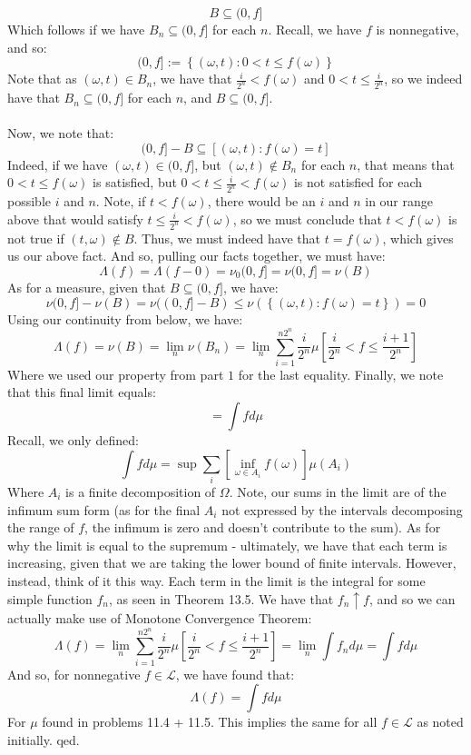 \documentclass[12pt,a4paper]{article}
\newcommand{\1}[1]{\mathbbm{1}\left\{ #1 \right\}}
\newcommand{\lcal}{\mathcal{L}}
\begin{document}
\begin{enumerate}
	$$
		B \subseteq (0,f]
	$$
	Which follows if we have $B_n \subseteq (0,f]$ for each $n$. Recall, we have $f$ is nonnegative, and so:
	$$
		(0,f]:= \left\{(\omega, t) : 0 < t \leq f(\omega)\right\}
	$$
	Note that as $(\omega, t) \in B_n$, we have that $\frac{i}{2^n} < f(\omega)$ and $0 < t \leq \frac{i}{2^n}$, so we indeed have that $B_n \subseteq (0,f]$ for each $n$, and $B \subseteq (0,f]$.
	\\\\
	Now, we note that:
	$$
		(0,f] - B \subseteq [(\omega,t) : f(\omega) = t]
	$$
	Indeed, if we have $(\omega,t) \in (0,f]$, but $(\omega,t) \not\in B_n$ for each $n$, that means that $0 < t \leq f(\omega)$ is satisfied, but $0 < t \leq \frac{i}{2^n} < f(\omega)$ is not satisfied for each possible $i$ and $n$. Note, if $t < f(\omega)$, there would be an $i$ and $n$ in our range above that would satisfy $t \leq \frac{i}{2^n} < f(\omega)$, so we must conclude that $t < f(\omega)$ is not true if $(t,\omega) \not\in B$. Thus, we must indeed have that $t = f(\omega)$, which gives us our above fact. And so, pulling our facts together, we must have:
	$$
		\Lambda(f) = \Lambda(f - 0) = \nu_0(0,f] = \nu(0,f] = \nu(B)
	$$
	As for a measure, given that $B \subseteq (0,f]$, we have: 
	$$
		\nu(0,f] - \nu(B) = \nu((0,f] - B) \leq \nu\left(\left\{(\omega, t) : f(\omega) = t\right\}\right) = 0
	$$
	Using our continuity from below, we have:
	$$
		\Lambda(f) = \nu(B) = \lim_n \nu(B_n) = 
		\lim_n \sum_{i=1}^{n2^n} \frac{i}{2^n} \mu\left[\frac{i}{2^n} < f \leq \frac{i+1}{2^n}\right]
	$$
	Where we used our property from part $1$ for the last equality. Finally, we note that this final limit equals:
	$$
		= \int f d\mu
	$$
	Recall, we only defined:
	$$
		\int f d\mu = \sup \sum_i\left[\inf_{\omega \in A_i} f(\omega)\right]\mu(A_i)
	$$
	Where $A_i$ is a finite decomposition of $\Omega$. Note, our sums in the limit are of the infimum sum form (as for the final $A_i$ not expressed by the intervals decomposing the range of $f$, the infimum is zero and doesn't contribute to the sum). As for why the limit is equal to the supremum - ultimately, we have that each term is increasing, given that we are taking the lower bound of finite intervals. However, instead, think of it this way. Each term in the limit is the integral for some simple function $f_n$, as seen in Theorem 13.5. We have that $f_n \uparrow f$, and so we can actually make use of Monotone Convergence Theorem:
	$$
		\Lambda(f) = \lim_n \sum_{i=1}^{n2^n} \frac{i}{2^n} \mu\left[\frac{i}{2^n} < f \leq \frac{i+1}{2^n}\right] = \lim_n \int f_n d\mu = \int f d\mu
	$$
	And so, for nonnegative $f \in \lcal$, we have found that:
	$$
		\Lambda(f) = \int f d\mu
	$$
	For $\mu$ found in problems 11.4 + 11.5. This implies the same for all $f \in \lcal$ as noted initially. qed.
\end{enumerate}
\end{document}
